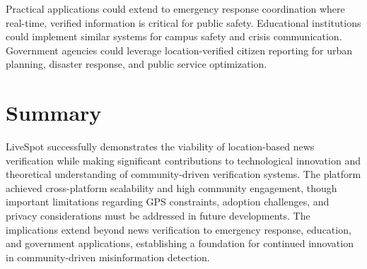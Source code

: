 Practical applications could extend to emergency response coordination where real-time, verified information is critical for public safety. Educational institutions could implement similar systems for campus safety and crisis communication. Government agencies could leverage location-verified citizen reporting for urban planning, disaster response, and public service optimization.

\section{Summary}
\label{sec:discussion_summary}

LiveSpot successfully demonstrates the viability of location-based news verification while making significant contributions to technological innovation and theoretical understanding of community-driven verification systems. The platform achieved cross-platform scalability and high community engagement, though important limitations regarding GPS constraints, adoption challenges, and privacy considerations must be addressed in future developments. The implications extend beyond news verification to emergency response, education, and government applications, establishing a foundation for continued innovation in community-driven misinformation detection.
